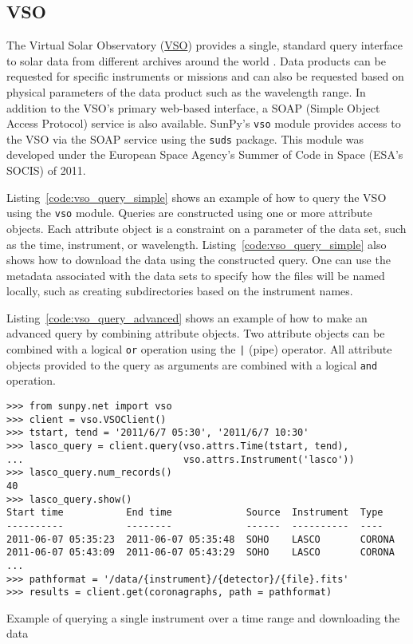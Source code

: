 \subsection{VSO}\label{ssec:vso}

The Virtual Solar Observatory (\href{http://virtualsolar.org}{VSO}) provides a 
single, standard query interface to solar data from different archives 
around the world \citep{hill2009}.
Data products can be requested for specific instruments or missions and
can also be requested based on physical parameters of the data product such
as the wavelength range.
In addition to the VSO's primary web-based interface, a SOAP (Simple Object 
Access Protocol) service is also available.
SunPy's \texttt{vso} module provides access to the VSO via the SOAP service using the
\texttt{suds} package.
This module was developed under the European Space Agency's Summer of Code in 
Space (ESA's SOCIS) of 2011.

Listing~\ref{code:vso_query_simple} shows an example of how to query the VSO
using the \texttt{vso} module.
Queries are constructed using one or more attribute objects. Each
attribute object is a constraint on a parameter of the data set, such as the
time, instrument, or wavelength.
Listing~\ref{code:vso_query_simple} also shows how to download the data using
the constructed query. One can use the metadata associated with the data sets to 
specify how the files will be named locally, such as creating subdirectories 
based on the instrument names.

Listing~\ref{code:vso_query_advanced} shows an example of how to make an advanced
query by combining attribute objects.
Two attribute objects can be combined with a logical \texttt{or} operation
using the \texttt{|} (pipe) operator.
All attribute objects provided to the query as arguments are combined with a 
logical \texttt{and} operation.

\begin{listing}[H]
\begin{verbatim}
>>> from sunpy.net import vso
>>> client = vso.VSOClient()
>>> tstart, tend = '2011/6/7 05:30', '2011/6/7 10:30'
>>> lasco_query = client.query(vso.attrs.Time(tstart, tend),
...                            vso.attrs.Instrument('lasco'))
>>> lasco_query.num_records()
40
>>> lasco_query.show() 
Start time           End time             Source  Instrument  Type
----------           --------             ------  ----------  ----
2011-06-07 05:35:23  2011-06-07 05:35:48  SOHO    LASCO       CORONA
2011-06-07 05:43:09  2011-06-07 05:43:29  SOHO    LASCO       CORONA
...
>>> pathformat = '/data/{instrument}/{detector}/{file}.fits'
>>> results = client.get(coronagraphs, path = pathformat)
\end{verbatim}
\caption{Example of querying a single instrument over a time range and downloading the data}
\label{code:vso_query_simple}
\end{listing}


